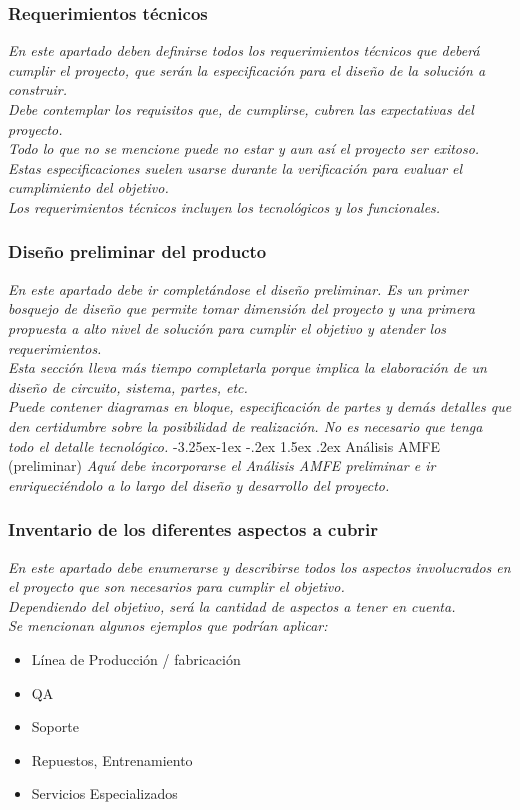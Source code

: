 \documentclass[12pt]{article}
\makeatletter
\renewcommand\paragraph{\@startsection{paragraph}{4}{\z@}%
                                     {-3.25ex\@plus -1ex \@minus -.2ex}%
                                     {1.5ex \@plus .2ex}%
                                     {\normalfont\normalsize\bfseries}}
\makeatother
\begin{document}
\subsubsection{Requerimientos técnicos}
{\it
En este apartado deben definirse todos los requerimientos técnicos que deberá cumplir el proyecto, que serán la especificación para el diseño de la solución a construir.\\
Debe contemplar los requisitos que, de cumplirse, cubren las expectativas del proyecto.\\
Todo lo que no se mencione puede no estar y aun así el proyecto ser exitoso.\\
Estas especificaciones suelen usarse durante la verificación para evaluar el cumplimiento del objetivo.\\
Los requerimientos técnicos incluyen los tecnológicos y los funcionales.
}

\subsubsection{Diseño preliminar del producto}
{\it
En este apartado debe ir completándose el diseño preliminar. Es un primer bosquejo de diseño que permite tomar dimensión del proyecto y una primera propuesta a alto nivel de solución para cumplir el objetivo y atender los requerimientos.\\
Esta sección lleva más tiempo completarla porque implica la elaboración de un diseño de circuito, sistema, partes, etc.\\
Puede contener diagramas en bloque, especificación de partes y demás detalles que den certidumbre sobre la posibilidad de realización. No es necesario que tenga todo el detalle tecnológico.
}
    \paragraph{Análisis AMFE (preliminar)}
    {\it
    Aquí debe incorporarse el Análisis AMFE preliminar e ir enriqueciéndolo a lo largo del diseño y desarrollo del proyecto.
    }


\subsubsection{Inventario de los diferentes aspectos a cubrir}
{\it
En este apartado debe enumerarse y describirse todos los aspectos involucrados en el proyecto que son necesarios para cumplir el objetivo.\\
Dependiendo del objetivo, será la cantidad de aspectos a tener en cuenta.\\
Se mencionan algunos ejemplos que podrían aplicar:

\begin{itemize}
\setlength{\itemsep}{3 pt}
    \item Línea de Producción / fabricación
    \item QA
    \item Soporte
    \item Repuestos, Entrenamiento
    \item Servicios Especializados
\end{itemize}
}
\end{document}
